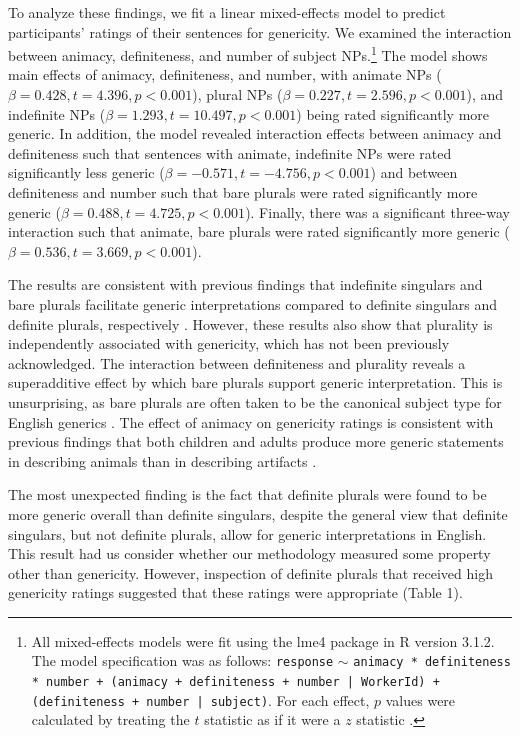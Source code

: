 \documentclass[10pt,letterpaper]{article}
\begin{document}
To analyze these findings, we fit a linear mixed-effects model to predict participants' ratings of their sentences for genericity. We examined the interaction between animacy, definiteness, and number of subject NPs.\footnote{All mixed-effects models were fit using the lme4 package in R version 3.1.2. The model specification was as follows: \texttt{response} \(\sim\) \texttt{animacy * definiteness * number + (animacy + definiteness + number | WorkerId) + (definiteness + number | subject)}. For each effect, \(p\) values were calculated by treating the \(t\) statistic as if it were a \(z\) statistic \cite{Barr:2013}.} The model shows main effects of animacy, definiteness, and number, with animate NPs (\(\beta = 0.428, t = 4.396, p < 0.001\)), plural NPs (\(\beta = 0.227, t = 2.596, p < 0.001\)), and indefinite NPs (\(\beta = 1.293, t = 10.497, p < 0.001\)) being rated significantly more generic. In addition, the model revealed interaction effects between animacy and definiteness such that sentences with animate, indefinite NPs were rated significantly less generic (\(\beta = -0.571, t = -4.756, p < 0.001\)) and between definiteness and number such that bare plurals were rated significantly more generic (\(\beta = 0.488, t = 4.725, p < 0.001\)). Finally, there was a significant three-way interaction such that animate, bare plurals were rated significantly more generic (\(\beta = 0.536, t = 3.669, p < 0.001\)). 

The results are consistent with previous findings that indefinite singulars and bare plurals facilitate generic interpretations compared to definite singulars and definite plurals, respectively \cite{Cimpian:2011, Gelman:2003}. However, these results also show that plurality is independently associated with genericity, which has not been previously acknowledged. The interaction between definiteness and plurality reveals a superadditive effect by which bare plurals support generic interpretation. This is unsurprising, as bare plurals are often taken to be the canonical subject type for English generics \cite{Carlson:1977,Krifka:1995,Lyons:1977}. The effect of animacy on genericity ratings is consistent with previous findings that both children and adults produce more generic statements in describing animals than in describing artifacts \cite{Brandone:2009}.

The most unexpected finding is the fact that definite plurals were found to be more generic overall than definite singulars, despite the general view that definite singulars, but not definite plurals, allow for generic interpretations in English. This result had us consider whether our methodology measured some property other than genericity. However, inspection of definite plurals that received high genericity ratings suggested that these ratings were appropriate (Table 1).
\end{document}
